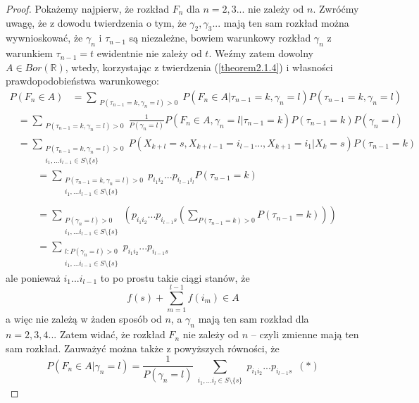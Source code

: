 \documentclass[a4paper]{article}
\theoremstyle{defn}
\theoremstyle{theorem}
\theoremstyle{lemma}
\theoremstyle{cor}
\theoremstyle{fact}
\begin{document}
\begin{proof}Pokażemy najpierw, że rozkład $F_n$ dla $n=2,3...$ nie zależy od $n$. Zwróćmy uwagę, że z dowodu twierdzenia o tym, że $\gamma_2, \gamma_3...$ mają ten sam rozkład można wywnioskować, że $\gamma_n$ i $\tau_{n-1}$ są niezależne, bowiem warunkowy rozkład $\gamma_n$ z warunkiem $\tau_{n-1} = t$ ewidentnie nie zależy od $t$. Weźmy zatem dowolny $A \in Bor(\mathbb{R})$, wtedy, korzystając z twierdzenia (\ref{theorem2.1.4}) i własności prawdopodobieństwa warunkowego:
\begin{align*}
 P(F_n \in A) &= \sum\limits_{\substack{P(\tau_{n-1} = k, \gamma_{n} = l) > 0}} P(F_n \in A |\tau_{n-1} = k, \gamma_{n} = l)P(\tau_{n-1} = k, \gamma_{n} = l)
 \end{align*}
 \begin{align*}
 &=\sum\limits_{\substack{P(\tau_{n-1} = k, \gamma_{n} = l) > 0}} \frac{1}{P(\gamma_{n} = l)} P(F_n \in A, \gamma_{n} = l |\tau_{n-1} = k)P(\tau_{n-1} = k) P(\gamma_{n} = l)
 \end{align*}
 \begin{align*}
 &=\sum\limits_{\substack{P(\tau_{n-1} = k, \gamma_{n} = l) > 0\\i_1, ... i_{l-1} \in S\setminus \{s\}}} P(X_{k+l} = s, X_{k+l-1} = i_{l-1} ..., X_{k+1} = i_1|X_{k} = s)P(\tau_{n-1} = k)
 \end{align*}
 \begin{align*}
 &= \sum\limits_{\substack{P(\tau_{n-1} = k, \gamma_{n} = l) > 0\\i_1, ... i_{l-1} \in S\setminus \{s\}}} p_{i_1 i_2} ... p_{i_{l-1}i_l}P(\tau_{n-1} = k) \\\\
 &=\sum\limits_{\substack{P(\gamma_{n} = l) > 0\\i_1, ... i_{l-1} \in S\setminus \{s\}}} \left( p_{i_1 i_2} ... p_{i_{l-1}s} \left( \sum\limits_{P(\tau_{n-1} = k) > 0} P(\tau_{n-1} = k)\right) \right) \\
 &= \sum\limits_{\substack{l: P(\gamma_{n} = l) > 0\\i_1, ... i_{l-1} \in S\setminus \{s\}}} p_{i_1 i_2} ... p_{i_{l-1}s}
\end{align*}
ale ponieważ $i_1 ... i_{l-1}$ to po prostu takie ciągi stanów, że $$f(s) + \sum\limits_{m = 1}^{l-1} f(i_m) \in A$$
a więc nie zależą w żaden sposób od $n$, a $\gamma_n$ mają ten sam rozkład dla $n=2,3,4...$ Zatem widać, że rozkład $F_n$ nie zależy od $n$ – czyli zmienne mają ten sam rozkład. Zauważyć można także z powyższych równości, że $$P(F_n \in A|\gamma_n = l) = \frac{1}{P(\gamma_{n} = l)} \sum\limits_{\substack{i_1, ... i_{l} \in S \setminus \{s\} }} p_{i_1 i_2} ... p_{i_{l-1}s}\,\,\,(*)$$

\end{proof}
\end{document}
